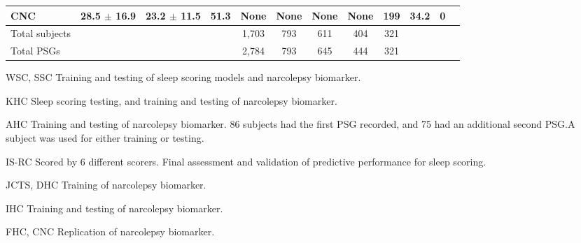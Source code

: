 \begin{landscape}
\begin{table}
\begin{threeparttable}
\begin{tabular}{@{}lccccccccccc@{}}
    CNC            & 28.5 $ \pm $ 16.9 & 23.2 $ \pm $ 11.5 & 51.3      & None               & None & None                 & None         & 199         & 34.2     & 0 \\ \midrule
    Total subjects &             &             &           & 1,703              & 793  & 611                  & 404          & 321         &          & \\
    Total PSGs     &             &             &           & 2,784              & 793  & 645                  & 444          & 321         &          & \\ \bottomrule
\end{tabular}
\begin{tablenotes}
\footnotesize
\item WSC, SSC \quad Training and testing of sleep scoring models and narcolepsy biomarker.
\item KHC \quad Sleep scoring testing, and training and testing of narcolepsy biomarker.
\item AHC \quad Training and testing of narcolepsy biomarker. 86 subjects had the first PSG recorded, and 75 had an additional second PSG.\newline A subject was used for either training or testing.
\item IS-RC \quad Scored by 6 different scorers. Final assessment and validation of predictive performance for sleep scoring.
\item JCTS, DHC \quad Training of narcolepsy biomarker.
\item IHC \quad Training and testing of narcolepsy biomarker.
\item FHC, CNC \quad Replication of narcolepsy biomarker. 
\end{tablenotes}
\end{threeparttable}
\end{table}
\end{landscape}

